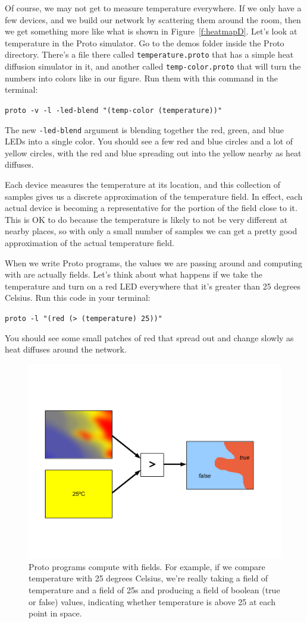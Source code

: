 \documentclass{article}
\newcommand\code[1]{\begin{center}\var{#1}\end{center}}
\newcommand\var[1]{{\tt #1}}
\begin{document}
Of course, we may not get to measure temperature everywhere.  If we
only have a few devices, and we build our network by scattering them
around the room, then we get something more like what is shown in
Figure~\ref{f:heatmapD}.  Let's look at temperature in the Proto
simulator.  Go to the demos folder inside the Proto directory.
There's a file there called \var{temperature.proto} that has a simple
heat diffusion simulator in it, and another called \var{temp-color.proto}
that will turn the numbers into colors like in our figure.  Run them
with this command in the terminal:
\code{proto -v -l -led-blend "(temp-color (temperature))"}
The new \var{-led-blend} argument is blending together the red, green,
and blue LEDs into a single color.  You should see a few red and blue
circles and a lot of yellow circles, with the red and blue spreading out
into the yellow nearby as heat diffuses.

Each device measures the temperature at its location, and this
collection of samples gives us a discrete approximation of the
temperature field.  In effect, each actual device is becoming a
representative for the portion of the field close to it.  This is OK
to do because the temperature is likely to not be very different at
nearby places, so with only a small number of samples we can get a
pretty good approximation of the actual temperature field.

When we write Proto programs, the values we are passing around and
computing with are actually fields.  Let's think about what happens if
we take the temperature and turn on a red LED everywhere that it's
greater than 25 degrees Celsius.  Run this code in your terminal:
\code{proto -l "(red (> (temperature) 25))"} You should see some small
patches of red that spread out and change slowly as heat diffuses
around the network.  

\begin{figure}[ht]
\centering
\includegraphics[width=5in]{figures/fieldoperation.pdf}
\caption{Proto programs compute with fields.  For example, if we
  compare temperature with 25 degrees Celsius, we're really taking a
  field of temperature and a field of 25s and producing a field of
  boolean (true or false) values, indicating whether temperature is
  above 25 at each point in space.}
\label{f:fieldoperation}
\end{figure}
\end{document}
